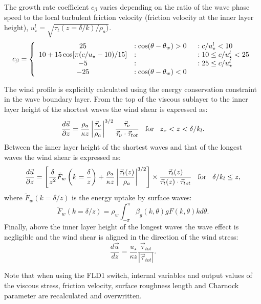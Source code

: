 The growth rate coefficient $c_\beta$ varies depending on the ratio of the wave phase speed to the local turbulent friction velocity (friction velocity at the inner layer height), $u_\star^l=\sqrt{\tau_t(z=\delta/k)/\rho_a)}$.
\begin{equation}
c_{\beta}=\left\{
\begin{array}{cll} 
25  &: \cos(\theta-\theta_w)>0 \hspace{2mm}&:c/u_{\star}^l<10\\
10+15\cos[\pi(c/u_\star-10)/15]   &:&:10\le c/u_{\star}^l<25 \\
-5  &:&:25\le c/u_{\star}^l\\
-25  &: \cos(\theta-\theta_w)<0 &\\
\end{array}
\right.
\end{equation}

The wind profile is explicitly calculated using the energy conservation constraint in the wave boundary layer.
From the top of the viscous sublayer to the inner layer height of the shortest waves the wind shear is expressed as:
\begin{equation}
\frac{d {\vec{u}}}{\partial z}=\frac{\rho_a}{\kappa z}\left|\frac{ \vec{\tau}_\nu}{\rho_a}\right|^{3/2}\frac{\vec{\tau}_\nu}{\vec{\tau}_\nu\cdot\vec{\tau}_{tot}}\hspace{3mm}{\rm for}\hspace{3mm}z_\nu<z<\delta/k_l.
\end{equation}
Between the inner layer height of the shortest waves and that of the longest waves the wind shear is expressed as:
\begin{equation}
\frac{d {\vec{u}}}{\partial z}=\left[ \frac{\delta}{z^2}\tilde{F}_w\left(k=\frac{\delta}{z}\right)+\frac{\rho_a}{\kappa z}\left| \frac{\vec{\tau}_t(z)}{\rho_a}\right|^{3/2} \right]\times\frac{\vec{\tau}_t(z)}{\vec{\tau}_t(z)\cdot\vec{\tau}_{tot}}\hspace{3mm}{\rm for}\hspace{3mm}\delta/k_l\le z,
\end{equation}
where $\tilde{F}_w(k=\delta/z)$ is the energy uptake by surface waves:
\begin{equation}
\tilde{F}_w(k=\delta/z)=\rho_w\int^{\pi}_{-\pi}\beta_g(k,\theta)gF(k,\theta)k d\theta.
\end{equation}
Finally, above the inner layer height of the longest waves the wave effect is negligible and the wind shear is aligned in the direction of the wind stress:
\begin{equation}
\frac{d{\vec{u}}}{dz}=\frac{u_\star}{\kappa z}\frac{\vec{\tau}_{tot}}{|\vec{\tau}_{tot}|}.
\end{equation}

Note that when using the FLD1 switch, internal variables and output values of the viscous stress, friction velocity, surface roughness length and Charnock parameter are recalculated and overwritten. 
